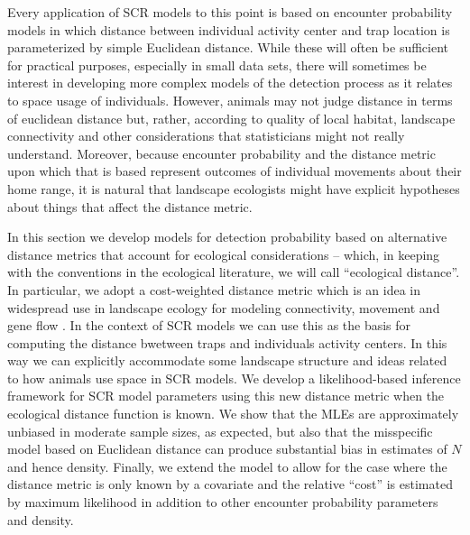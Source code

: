 Every application of SCR models to this point is based on encounter 
probability models in which distance between individual activity center 
and trap location is parameterized by simple Euclidean distance.
While these will often be sufficient for practical purposes,
especially in small data sets, there will sometimes be interest in
developing more complex models of the detection process as it relates
to space usage of individuals.
However, animals may not judge distance in terms of euclidean distance
but, rather, according to quality of local habitat, landscape
connectivity and other considerations that statisticians might not
really understand. Moreover, because encounter probability and the
distance metric upon which that is based represent outcomes of
individual movements about their home range, it is natural that
landscape ecologists might have explicit hypotheses about things that
affect the distance metric.

In this section we develop models for detection probability based on
alternative distance metrics that account for ecological
considerations -- which, in keeping with the conventions in the
ecological literature, we will call ``ecological distance''. In
particular, we adopt a cost-weighted distance metric which is an idea
in widespread use in landscape ecology for modeling connectivity,
movement and gene flow
\citep{adriaensen_etal:2003,manel_etal:2003,mcrae_etal:2008}. In the
context of SCR models we can use this as the basis for computing the
distance bwetween traps and individuals activity centers. In this way
we can explicitly accommodate some landscape structure and ideas
related to how animals use space in SCR models. We develop a
likelihood-based inference framework for SCR model parameters using
this new distance metric when the ecological distance function is
known.  We show that the MLEs are approximately unbiased in moderate
sample sizes, as expected, but also that the misspecific model based
on Euclidean distance can produce substantial bias in estimates of $N$
and hence density.  Finally, we extend the model to allow for the case
where the distance metric is only known by a covariate and the
relative ``cost'' is estimated by maximum likelihood in addition to
other encounter probability parameters and density.


